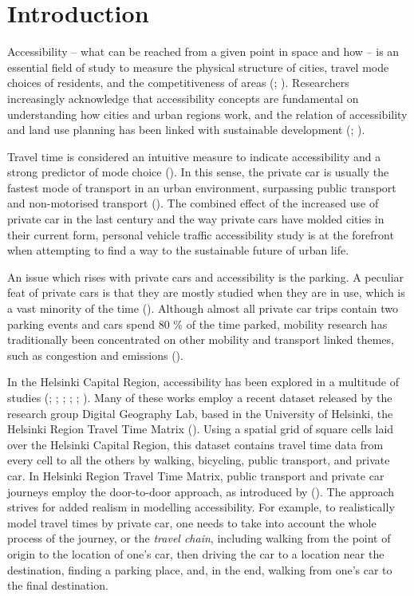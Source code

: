 \newpage
\section{Introduction}
\justify

Accessibility -- what can be reached from a given point in space and how -- is an essential field of study to measure the physical structure of cities, travel mode choices of residents, and the competitiveness of areas (\cite{Bertolini2005}; \cite{Toivonen2014a}). Researchers increasingly acknowledge that accessibility concepts are fundamental on understanding how cities and urban regions work, and the relation of accessibility and land use planning has been linked with sustainable development (\cite{TeBrommelstroet2014}; \cite{Wegener1999}).

Travel time is considered an intuitive measure to indicate accessibility and a strong predictor of mode choice (\cite{Frank2008}). In this sense, the private car is usually the fastest mode of transport in an urban environment, surpassing public transport and non-motorised transport (\cite{Salonen2014}). The combined effect of the increased use of private car in the last century and the way private cars have molded cities in their current form, personal vehicle traffic accessibility study is at the forefront when attempting to find a way to the sustainable future of urban life. 

An issue which rises with private cars and accessibility is the parking. A peculiar feat of private cars is that they are mostly studied when they are in use, which is a vast minority of the time (\cite{Diallo2015}). Although almost all private car trips contain two parking events and cars spend 80 \% of the time parked, mobility research has traditionally been concentrated on other mobility and transport linked themes, such as congestion and emissions (\cite{Bates2012}).

In the Helsinki Capital Region, accessibility has been explored in a multitude of studies (\cite{Jarvi2014}; \cite{Toivonen2014a}; \cite{Laatikainen2015}; \cite{Salonen2016}; \cite{Tenkanen2017}; \cite{Tenkanen2018}). Many of these works employ a recent dataset released by the research group Digital Geography Lab, based in the University of Helsinki, the Helsinki Region Travel Time Matrix (\cite{Tenkanen2018}). Using a spatial grid of square cells laid over the Helsinki Capital Region, this dataset contains travel time data from every cell to all the others by walking, bicycling, public transport, and private car. In Helsinki Region Travel Time Matrix, public transport and private car journeys employ the door-to-door approach, as introduced by \citeauthor{Salonen2013} (\citeyear{Salonen2013}). The approach strives for added realism in modelling accessibility. For example, to realistically model travel times by private car, one needs to take into account the whole process of the journey, or the \textit{travel chain}, including walking from the point of origin to the location of one's car, then driving the car to a location near the destination, finding a parking place, and, in the end, walking from one's car to the final destination.


